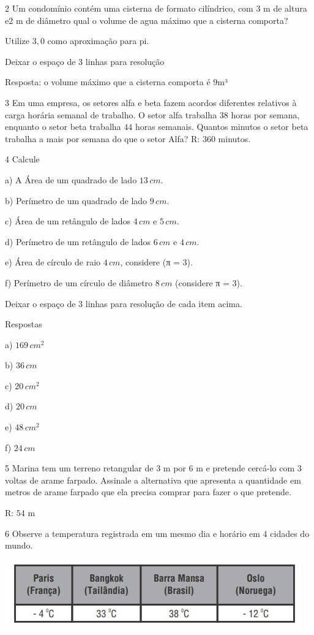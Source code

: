 \num{2}  Um condomínio contém uma cisterna de formato cilíndrico, com $3$ m de
altura e2 m de diâmetro qual o volume de agua máximo que a cisterna
comporta?

Utilize $3,0$ como aproximação para pi.

Deixar o espaço de $3$ linhas para resolução

Resposta: o volume máximo que a cisterna comporta é $9$m³

\num{3}  Em uma empresa, os setores alfa e beta fazem acordos diferentes
relativos à carga horária semanal de trabalho. O setor alfa trabalha $38$
horas por semana, enquanto o setor beta trabalha $44$ horas semanais.
Quantos minutos o setor beta trabalha a mais por semana do que o setor
Alfa? R: $360$ minutos.

\num{4}  Calcule

a) A Área de um quadrado de lado $13\,cm$.

b) Perímetro de um quadrado de lado $9\,cm$.

c) Área de um retângulo de lados $4\,cm$ e $5\,cm$.

d) Perímetro de um retângulo de lados $6\,cm$ e $4\,cm$.

e) Área de círculo de raio $4\,cm$, considere (π = $3$).

f) Perímetro de um círculo de diâmetro $8\,cm$ (considere π = $3$).

Deixar o espaço de $3$ linhas para resolução de cada item acima.

Respostas

a) $169\,cm^2$

b) $36\,cm$

c) $20\,cm^2$

d) $20\,cm$

e) $48\,cm^2$

f) $24\,cm$

\num{5}  Marina tem um terreno retangular de $3$ m por $6$ m e pretende cercá-lo
com $3$ voltas de arame farpado. Assinale a alternativa que apresenta a
quantidade em metros de arame farpado que ela precisa comprar para fazer
o que pretende.

R: $54$ m

\num{6}  Observe a temperatura registrada em um mesmo dia e horário em $4$
cidades do mundo.

\includegraphics[width=5.03125in,height=1.1875in]{./imgSAEB_6_MAT/media/image96.png}

